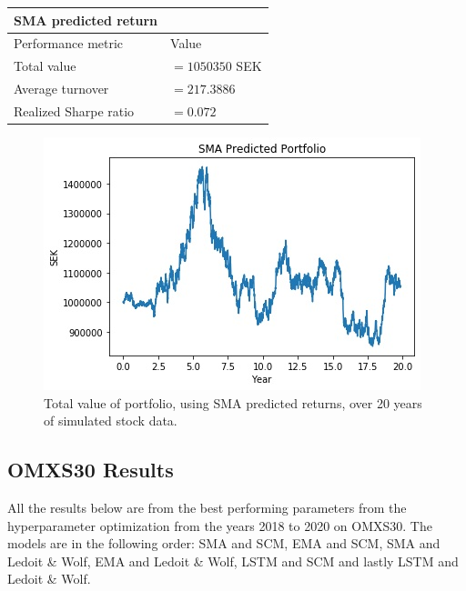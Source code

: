\documentclass[final]{LTHtwocol} %
\begin{document}
\begin{center}
 \begin{tabular}{||l l||} 
 \hline
 \textbf{SMA predicted return} & \\ [0.5ex] 
 \hline
 Performance metric & Value\\ [0.5ex] 
 \hline\hline
 Total value & $=1050350$ SEK \\ 
 \hline
 Average turnover& $=217.3886$ \\
 \hline
 Realized Sharpe ratio & $=0.072$ \\  [1ex] 
 \hline
\end{tabular}
\end{center}
\begin{figure}[h]
	\centering
	\includegraphics[width=0.8\columnwidth]{Pics/GraphtotValues_SMA.jpg}
	\caption{Total value of portfolio, using SMA predicted returns, over 20 years of simulated stock data.}
	\label{fig:GraphtotValues_SMA} 
\end{figure}
\subsection{OMXS30 Results}
All the results below are from the best performing parameters from the hyperparameter optimization from the years 2018 to 2020 on OMXS30. The models are in the following order: SMA and SCM, EMA and SCM, SMA and Ledoit \& Wolf, EMA and Ledoit \& Wolf, LSTM and SCM and lastly LSTM and Ledoit \& Wolf.
\end{document}
